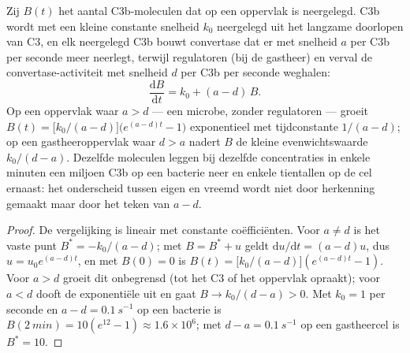 \begin{theorem}\label{thm:b3:innate-immunity:complement}
Zij $B(t)$ het aantal C3b-moleculen dat op een oppervlak is neergelegd.
C3b wordt met een kleine constante snelheid $k_{0}$ neergelegd uit het
langzame doorlopen van C3, en elk neergelegd C3b bouwt convertase dat
er met snelheid $a$ per C3b per seconde meer neerlegt, terwijl
regulatoren (bij de gastheer) en verval de convertase-activiteit met
snelheid $d$ per C3b per seconde weghalen:
\[
\frac{\mathrm{d}B}{\mathrm{d}t} = k_{0} + (a - d)\,B .
\]
Op een oppervlak waar $a > d$ --- een microbe, zonder regulatoren ---
groeit $B(t) = \bigl[k_{0}/(a-d)\bigr]\bigl(e^{(a-d)t} - 1\bigr)$
exponentieel met tijdconstante $1/(a - d)$; op een gastheeroppervlak
waar $d > a$ nadert $B$ de kleine evenwichtswaarde $k_{0}/(d - a)$.
Dezelfde moleculen leggen bij dezelfde concentraties in enkele minuten
een miljoen C3b op een bacterie neer en enkele tientallen op de cel
ernaast: het onderscheid tussen eigen en vreemd wordt niet door
herkenning gemaakt maar door het teken van $a - d$.
\end{theorem}
\begin{proof}
De vergelijking is lineair met constante coëfficiënten. Voor $a \ne d$
is het vaste punt $B^{*} = -k_{0}/(a-d)$; met $B = B^{*} + u$ geldt
$\mathrm{d}u/\mathrm{d}t = (a-d)u$, dus $u = u_{0}e^{(a-d)t}$, en met
$B(0) = 0$ is $B(t) = \bigl[k_{0}/(a-d)\bigr](e^{(a-d)t} - 1)$. Voor
$a > d$ groeit dit onbegrensd (tot het C3 of het oppervlak opraakt);
voor $a < d$ dooft de exponentiële uit en gaat $B \to k_{0}/(d-a) > 0$.
Met $k_{0} = 1$ per seconde en $a - d = \qty{0.1}{s^{-1}}$ op een
bacterie is $B(\qty{2}{min})
= 10(e^{12} - 1) \approx 1.6\times 10^{6}$; met $d - a =
\qty{0.1}{s^{-1}}$ op een gastheercel is $B^{*} = 10$.
\end{proof}

